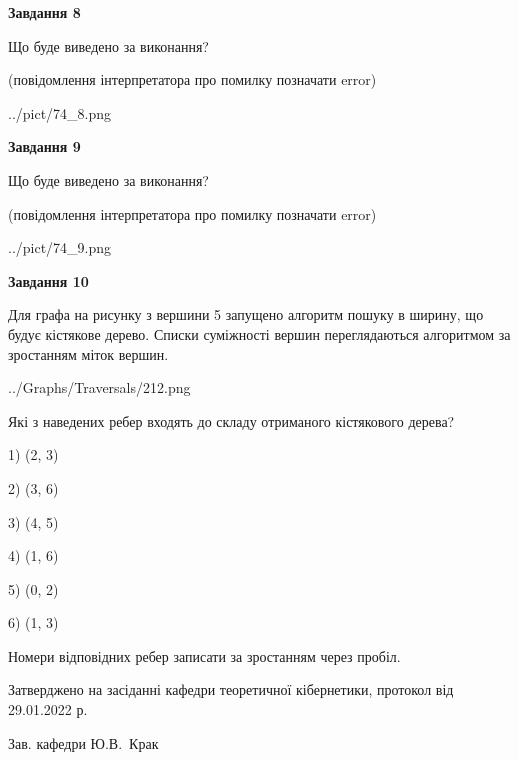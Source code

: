 \documentclass[12pt, ukrainian]{article}
\begin{document}
{\begin {large}
{\begin {center}\textbf{Завдання 8}\end {center}}\par
Що буде виведено за виконання?\par
 (повідомлення інтерпретатора про помилку позначати error)
\begin{center}
	{../pict/74_8.png}
\end{center}
\newpage

{\begin {center}\textbf{Завдання 9}\end {center}}\par
Що буде виведено за виконання?\par
 (повідомлення інтерпретатора про помилку позначати error)\par
\begin{center}
	{../pict/74_9.png}
\end{center}
\newpage

{\begin {center}\textbf{Завдання 10}\end {center}}\par
Для графа на рисунку з вершини 5 запущено алгоритм пошуку в ширину, що будує кістякове дерево. Списки суміжності вершин переглядаються алгоритмом за зростанням міток вершин.\par
\begin{center}
	{../Graphs/Traversals/212.png}
\end{center}
\par Які з наведених ребер входять до складу отриманого кістякового дерева?\par
1) (2, 3)\par
2) (3, 6)\par
3) (4, 5)\par
4) (1, 6)\par
5) (0, 2)\par
6) (1, 3)\par
{\vskip 15pt} Номери відповідних ребер записати за зростанням через пробіл.\par
\newpage


\end {large}
}
{\smallskip \begin {small} Затверджено на засіданні кафедри теоретичної кібернетики, протокол  від   29.01.2022 р.\par\smallskip\smallskip
{\parbox {6.5 cm}{Зав. кафедри \dotfill Ю.В.~Крак}} \end{small}}
\end{document}
